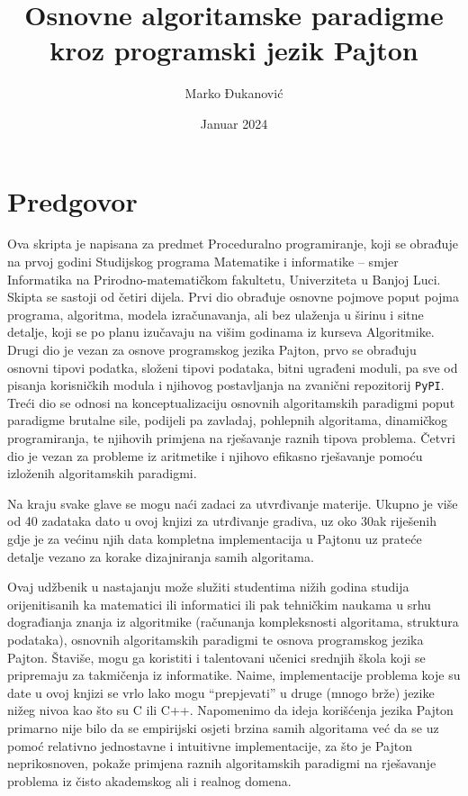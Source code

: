 \documentclass[b4paper,12pt]{book}
\begin{document}
\author{Marko Đukanović}
\title{Osnovne algoritamske paradigme kroz programski jezik Pajton}
\date{Januar 2024}

 
\maketitle
 
\tableofcontents
 \clearpage
 \setcounter{page}{1}

\chapter*{Predgovor}

Ova skripta je napisana za predmet Proceduralno programiranje, koji se obrađuje na prvoj godini Studijskog programa Matematike i informatike -- smjer Informatika na Prirodno-matematičkom fakultetu, Univerziteta u Banjoj Luci. Skipta se sastoji od četiri dijela. Prvi dio obrađuje osnovne pojmove poput pojma programa, algoritma, modela izraču\-navanja, ali bez ulaženja u širinu i sitne detalje, koji se po planu izučavaju na višim godinama iz kurseva Algoritmike. Drugi dio je vezan za osnove programskog jezika Pajton, prvo se obrađuju  osnovni tipovi podatka, složeni tipovi podataka, bitni ugrađeni moduli, pa sve od pisanja korisničkih modula i njihovog postavljanja na zvanični repozitorij \texttt{PyPI}. Treći dio se odnosi na konceptualizaciju osnovnih algoritamskih paradigmi poput paradigme brutalne sile, podijeli pa zavladaj, pohlepnih algoritama, dinamičkog programiranja, te njihovih primjena na rješavanje raznih tipova problema. Četvri dio je vezan za probleme iz aritmetike i njihovo efikasno rješavanje pomoću izloženih algoritamskih paradigmi. 

 Na kraju svake glave se mogu naći zadaci za utvrđivanje materije. Ukupno je više od 40 zadataka dato u ovoj knjizi za utrđivanje gradiva, uz oko 30ak riješenih gdje je za većinu njih data kompletna implementacija u Pajtonu uz prateće detalje vezano za korake dizajniranja samih algoritama. 
 
 
 Ovaj udžbenik u nastajanju može služiti studentima nižih godina studija orijenitisanih ka matematici ili informatici ili pak tehničkim naukama u srhu dograđianja znanja iz algoritmike (računanja kompleksnosti algoritama, struktura podataka), osnovnih algoritamskih paradigmi te osnova programskog jezika Pajton. Štaviše, mogu ga koristiti i talentovani učenici srednjih škola koji se pripremaju za takmičenja iz informatike. Naime, implementacije problema koje su date u ovoj knjizi se vrlo lako mogu ``prepjevati'' u druge (mnogo brže) jezike nižeg nivoa kao što su C ili C++. Napomenimo da ideja korišćenja jezika Pajton primarno nije bilo da se empirijski osjeti brzina samih algoritama već da se uz pomoć relativno jednostavne i intuitivne implementacije, za što je Pajton neprikosnoven, pokaže primjena raznih algoritamskih paradigmi na rješavanje problema iz čisto akademskog ali i realnog domena.
\end{document}
